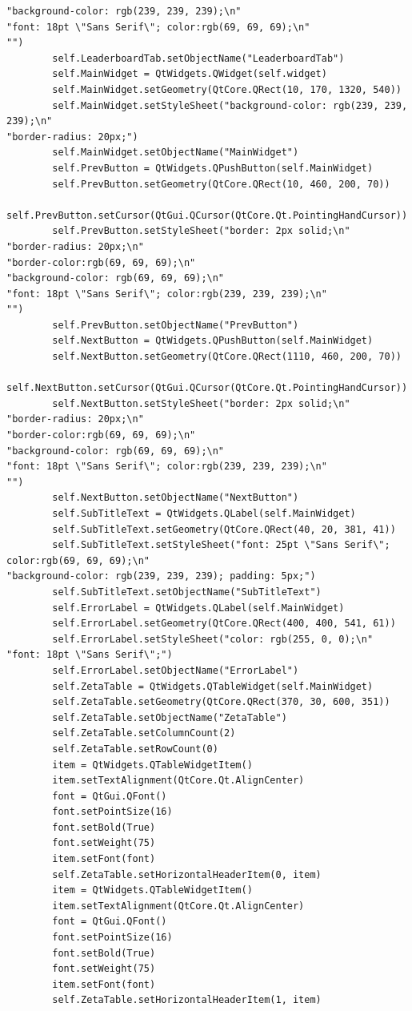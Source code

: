 \documentclass[12pt]{article}
\begin{document}
\begin{lstlisting}
"background-color: rgb(239, 239, 239);\n"
"font: 18pt \"Sans Serif\"; color:rgb(69, 69, 69);\n"
"")
        self.LeaderboardTab.setObjectName("LeaderboardTab")
        self.MainWidget = QtWidgets.QWidget(self.widget)
        self.MainWidget.setGeometry(QtCore.QRect(10, 170, 1320, 540))
        self.MainWidget.setStyleSheet("background-color: rgb(239, 239, 239);\n"
"border-radius: 20px;")
        self.MainWidget.setObjectName("MainWidget")
        self.PrevButton = QtWidgets.QPushButton(self.MainWidget)
        self.PrevButton.setGeometry(QtCore.QRect(10, 460, 200, 70))
        self.PrevButton.setCursor(QtGui.QCursor(QtCore.Qt.PointingHandCursor))
        self.PrevButton.setStyleSheet("border: 2px solid;\n"
"border-radius: 20px;\n"
"border-color:rgb(69, 69, 69);\n"
"background-color: rgb(69, 69, 69);\n"
"font: 18pt \"Sans Serif\"; color:rgb(239, 239, 239);\n"
"")
        self.PrevButton.setObjectName("PrevButton")
        self.NextButton = QtWidgets.QPushButton(self.MainWidget)
        self.NextButton.setGeometry(QtCore.QRect(1110, 460, 200, 70))
        self.NextButton.setCursor(QtGui.QCursor(QtCore.Qt.PointingHandCursor))
        self.NextButton.setStyleSheet("border: 2px solid;\n"
"border-radius: 20px;\n"
"border-color:rgb(69, 69, 69);\n"
"background-color: rgb(69, 69, 69);\n"
"font: 18pt \"Sans Serif\"; color:rgb(239, 239, 239);\n"
"")
        self.NextButton.setObjectName("NextButton")
        self.SubTitleText = QtWidgets.QLabel(self.MainWidget)
        self.SubTitleText.setGeometry(QtCore.QRect(40, 20, 381, 41))
        self.SubTitleText.setStyleSheet("font: 25pt \"Sans Serif\"; color:rgb(69, 69, 69);\n"
"background-color: rgb(239, 239, 239); padding: 5px;")
        self.SubTitleText.setObjectName("SubTitleText")
        self.ErrorLabel = QtWidgets.QLabel(self.MainWidget)
        self.ErrorLabel.setGeometry(QtCore.QRect(400, 400, 541, 61))
        self.ErrorLabel.setStyleSheet("color: rgb(255, 0, 0);\n"
"font: 18pt \"Sans Serif\";")
        self.ErrorLabel.setObjectName("ErrorLabel")
        self.ZetaTable = QtWidgets.QTableWidget(self.MainWidget)
        self.ZetaTable.setGeometry(QtCore.QRect(370, 30, 600, 351))
        self.ZetaTable.setObjectName("ZetaTable")
        self.ZetaTable.setColumnCount(2)
        self.ZetaTable.setRowCount(0)
        item = QtWidgets.QTableWidgetItem()
        item.setTextAlignment(QtCore.Qt.AlignCenter)
        font = QtGui.QFont()
        font.setPointSize(16)
        font.setBold(True)
        font.setWeight(75)
        item.setFont(font)
        self.ZetaTable.setHorizontalHeaderItem(0, item)
        item = QtWidgets.QTableWidgetItem()
        item.setTextAlignment(QtCore.Qt.AlignCenter)
        font = QtGui.QFont()
        font.setPointSize(16)
        font.setBold(True)
        font.setWeight(75)
        item.setFont(font)
        self.ZetaTable.setHorizontalHeaderItem(1, item)


\end{lstlisting}
\end{document}
